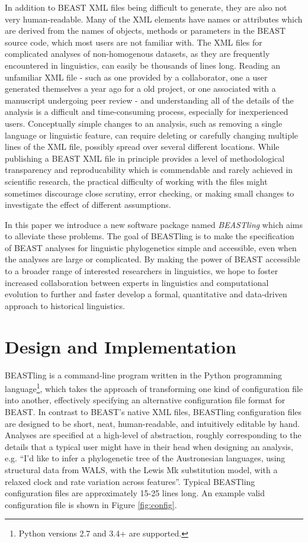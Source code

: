 \documentclass[twocolumn,10pt]{scrartcl}
\begin{document}
In addition to BEAST XML files being difficult to generate, they are also not very human-readable.  Many of the XML elements have names or attributes which are derived from the names of objects, methods or parameters in the BEAST source code, which most users are not familiar with.  The XML files for complicated analyses of non-homogenous datasets, as they are frequently encountered in linguistics, can easily be thousands of lines long.  Reading an unfamiliar XML file - such as one provided by a collaborator, one a user generated themselves a year ago for a old project, or one associated with a manuscript undergoing peer review - and understanding all of the details of the analysis is a difficult and time-consuming process, especially for inexperienced users.  Conceptually simple changes to an analysis, such as removing a single language or linguistic feature, can require deleting or carefully changing multiple lines of the XML file, possibly spread over several different locations.  While publishing a BEAST XML file in principle provides a level of methodological transparency and reproducability which is commendable and rarely achieved in scientific research, the practical difficulty of working with the files might sometimes discourage close scrutiny, error checking, or making small changes to investigate the effect of different assumptions.

In this paper we introduce a new software package named \emph{BEASTling} which aims to alleviate these problems.  The goal of BEASTling is to make the specification of BEAST analyses for linguistic phylogenetics simple and accessible, even when the analyses are large or complicated.  By making the power of BEAST accessible to a broader range of interested researchers in linguistics, we hope to foster increased collaboration between experts in linguistics and computational evolution to further and faster develop a formal, quantitative and data-driven approach to historical linguistics.

\section{Design and Implementation}

BEASTling is a command-line program written in the Python programming language\footnote{Python versions 2.7 and 3.4+ are supported.}, which takes the approach of transforming one kind of configuration file into another, effectively specifying an alternative configuration file format for BEAST.  In contrast to BEAST's native XML files, BEASTling configuration files are designed to be short, neat, human-readable, and intuitively editable by hand.  Analyses are specified at a high-level of abstraction, roughly corresponding to the details that a typical user might have in their head when designing an analysis, e.g. ``I'd like to infer a phylogenetic tree of the Austronesian languages, using structural data from WALS, with the Lewis Mk substitution model, with a relaxed clock and rate variation across features''.  Typical BEASTling configuration files are approximately 15-25 lines long.  An example valid configuration file is shown in Figure \ref{fig:config}.
\end{document}
